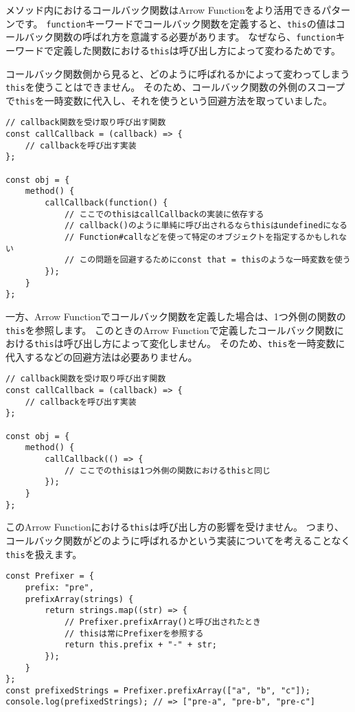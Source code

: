 メソッド内におけるコールバック関数はArrow
Functionをより活用できるパターンです。
\texttt{function}キーワードでコールバック関数を定義すると、\texttt{this}の値はコールバック関数の呼ばれ方を意識する必要があります。
なぜなら、\texttt{function}キーワードで定義した関数における\texttt{this}は呼び出し方によって変わるためです。

コールバック関数側から見ると、どのように呼ばれるかによって変わってしまう\texttt{this}を使うことはできません。
そのため、コールバック関数の外側のスコープで\texttt{this}を一時変数に代入し、それを使うという回避方法を取っていました。

\begin{lstlisting}
// callback関数を受け取り呼び出す関数
const callCallback = (callback) => {
    // callbackを呼び出す実装
};

const obj = {
    method() {
        callCallback(function() {
            // ここでのthisはcallCallbackの実装に依存する
            // callback()のように単純に呼び出されるならthisはundefinedになる
            // Function#callなどを使って特定のオブジェクトを指定するかもしれない
            // この問題を回避するためにconst that = thisのような一時変数を使う
        });
    }
};
\end{lstlisting}

一方、Arrow
Functionでコールバック関数を定義した場合は、1つ外側の関数の\texttt{this}を参照します。
このときのArrow
Functionで定義したコールバック関数における\texttt{this}は呼び出し方によって変化しません。
そのため、\texttt{this}を一時変数に代入するなどの回避方法は必要ありません。

\begin{lstlisting}
// callback関数を受け取り呼び出す関数
const callCallback = (callback) => {
    // callbackを呼び出す実装
};

const obj = {
    method() {
        callCallback(() => {
            // ここでのthisは1つ外側の関数におけるthisと同じ
        });
    }
};
\end{lstlisting}

このArrow
Functionにおける\texttt{this}は呼び出し方の影響を受けません。
つまり、コールバック関数がどのように呼ばれるかという実装についてを考えることなく\texttt{this}を扱えます。

\begin{lstlisting}
const Prefixer = {
    prefix: "pre",
    prefixArray(strings) {
        return strings.map((str) => {
            // Prefixer.prefixArray()と呼び出されたとき
            // thisは常にPrefixerを参照する
            return this.prefix + "-" + str;
        });
    }
};
const prefixedStrings = Prefixer.prefixArray(["a", "b", "c"]);
console.log(prefixedStrings); // => ["pre-a", "pre-b", "pre-c"]
\end{lstlisting}


